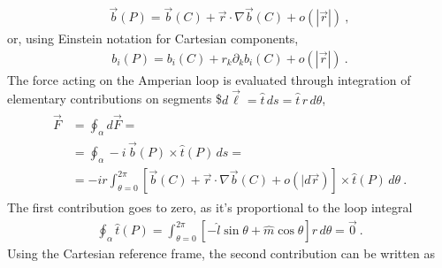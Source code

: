 \documentclass[letterpaper,10pt,english]{jupyterBook}
\begin{document}
\sphinxAtStartPar
{}
\begin{equation*}
\begin{split}\vec{b}(P) = \vec{b}(C) + \vec{r} \cdot \nabla \vec{b}(C) + o(|\vec{r}|) \ ,\end{split}
\end{equation*}
\sphinxAtStartPar
or, using Einstein notation for Cartesian components,
\begin{equation*}
\begin{split}b_i(P) = b_i(C) + r_k \partial_k b_i(C) + o(|\vec{r}|) \ .\end{split}
\end{equation*}
\sphinxAtStartPar
{} The force acting on the Amperian loop is evaluated through integration of elementary contributions on segments \$\(d \vec{\ell} = \hat{t} \, ds = \hat{t} \, r \, d\theta\),
\begin{equation*}
\begin{split}\begin{aligned}
 \vec{F} 
 & = \oint_{\alpha} d \vec{F} = \\
 & = \oint_{\alpha} - i \, \vec{b}(P) \times \hat{t}(P) \, ds = \\
 & = -i r \int_{\theta=0}^{2 \pi} \left[ \vec{b}(C) + \vec{r} \cdot \nabla \vec{b}(C) + o(|d \vec{r}) \right] \times \hat{t}(P) \, d \theta \ .
\end{aligned}\end{split}
\end{equation*}
\sphinxAtStartPar
The first contribution goes to zero, as it’s proportional to the loop integral
\begin{equation*}
\begin{split}\oint_{\alpha} \hat{t}(P) = \int_{\theta=0}^{2\pi} \left[ - \hat{l} \sin \theta + \hat{m} \cos \theta \right] r \, d \theta = \vec{0} \ .\end{split}
\end{equation*}
\sphinxAtStartPar
Using the Cartesian reference frame, the second contribution can be written as
\end{document}

